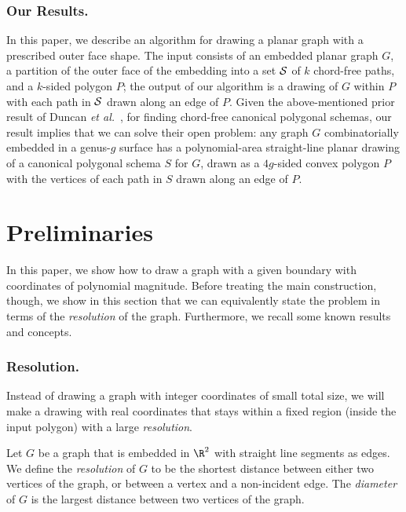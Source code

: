 \documentclass[11pt]{article}
\renewcommand{\subsection}[1]{\subsubsection{#1.}}
\begin{document}
\subsection{Our Results}
In this paper, we describe an algorithm for drawing a planar graph with a prescribed outer face shape.
The input consists of an embedded planar graph $G$, a partition of the outer face of the embedding into a set $\cal S$ of $k$ chord-free paths, and a $k$-sided polygon $P$; the output of our algorithm is a drawing of $G$ within $P$ with each path in $\cal S$ drawn along an edge of
$P$.
Given the above-mentioned prior result of Duncan {\it et al.}~\cite{duncan},
for finding chord-free canonical polygonal schemas,
our result implies that we can solve their open problem: any
graph $G$ combinatorially embedded
in a genus-$g$ surface has a polynomial-area straight-line planar drawing
of a canonical polygonal schema $S$ for $G$,
drawn as a $4g$-sided convex polygon $P$ with
the vertices of each path in $S$ drawn along
an edge of $P$.

\section {Preliminaries} \label {sec:prelims}

  In this paper, we show how to draw a graph with a given boundary with
  coordinates of polynomial magnitude.
  Before treating the main construction,
  though, we show in this section that
  we can equivalently state the problem
  in terms of the \emph{resolution} of the
  graph. Furthermore, we recall some known results and concepts.

  \subsection {Resolution}

    Instead of drawing a graph with integer coordinates of small total size, we
    will make a drawing with real coordinates that stays within a fixed region
    (inside the input polygon) with a large \emph {resolution}.



    Let $G$ be a graph that is embedded in $\R^2$ with straight line segments as
    edges. We define the \emph {resolution} of $G$ to be the shortest distance
    between either two vertices of the graph, or between a vertex and a
    non-incident edge.
    The \emph {diameter} of $G$ is the largest distance between two vertices of the graph.  
    
\end{document}
